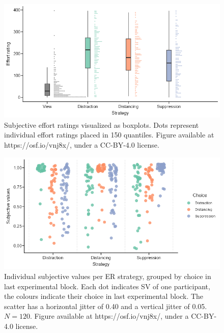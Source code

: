 \documentclass[
  man,floatsintext]{apa6}
\begin{document}
\begin{figure}[H]
\includegraphics[width=\textwidth]{figures/FigSubjEffort} \caption{Subjective effort ratings visualized as boxplots. Dots represent individual effort ratings placed in 150 quantiles. Figure available at https://osf.io/vnj8x/, under a CC-BY-4.0 license.}\label{fig:FigSubjEffort}
\end{figure}

\begin{figure}[H]
\includegraphics[width=\textwidth]{figures/FigSVChoice} \caption{Individual subjective values per ER strategy, grouped by choice in last experimental block. Each dot indicates SV of one participant, the colours indicate their choice in last experimental block. The scatter has a horizontal jitter of 0.40 and a vertical jitter of 0.05. $N=120$. Figure available at https://osf.io/vnj8x/, under a CC-BY-4.0 license.}\label{fig:FigSVChoice}
\end{figure}
\end{document}
